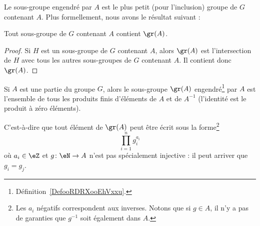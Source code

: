 Le sous-groupe engendré par \( A \) est le plus petit (pour l'inclusion) groupe de \( G\) contenant \( A\). Plus formellement, nous avons le résultat suivant :
\begin{lemma}
	Tout sous-groupe de \( G\) contenant \( A\) contient \( \gr(A)\).
\end{lemma}

\begin{proof}
	Si \( H\) est un sous-groupe de \( G\) contenant \( A\), alors \( \gr(A)\) est l'intersection de \( H\) avec tous les autres sous-groupes de \( G\) contenant \( A\). Il contient donc \( \gr(A)\).
\end{proof}

\begin{lemma}   \label{LemFUIZooBZTCiy}
	Si \( A\) est une partie du groupe \( G\), alors le sous-groupe \( \gr(A)\) engendré\footnote{Définition~\ref{DefooRDRXooEhVxxu}.} par \( A\) est l'ensemble de tous les produits finis d'éléments de \( A\) et de \( A^{-1}\) (l'identité est le produit à zéro éléments).

	C'est-à-dire que tout élément de \( \gr(A)\) peut être écrit sous la forme\footnote{Les \( a_i\) négatifs correspondent aux inverses. Notons que si \( g\in A\), il n'y a pas de garanties que \( g^{-1}\) soit également dans \( A\).}
	\begin{equation}
		\prod_{i=1}^ng_i^{a_i}
	\end{equation}
	où \( a_i\in \eZ\) et \( g\colon \eN\to A\) n'est pas spécialement injective : il peut arriver que \( g_i=g_j\).
\end{lemma}

